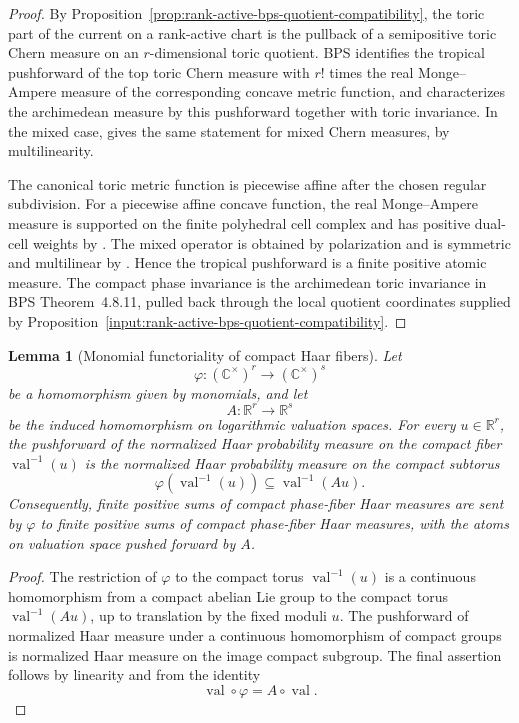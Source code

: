\documentclass[10pt,a4paper]{amsart}
\theoremstyle{plain}
\newtheorem{lemma}[theorem]{Lemma}
\theoremstyle{plain}
\numberwithin{equation}{section}
\begin{document}
\begin{proof}
	By Proposition~\ref{prop:rank-active-bps-quotient-compatibility}, the toric
	part of the current on a rank-active chart is the pullback of a semipositive
	toric Chern measure on an \(r\)-dimensional toric quotient.  BPS
	\cite[Theorem~4.8.11]{BPS14} identifies the tropical pushforward of the top
	toric Chern measure with \(r!\) times the real Monge--Ampere measure of the
	corresponding concave metric function, and characterizes the archimedean
	measure by this pushforward together with toric invariance.  In the mixed
	case, \cite[Corollary~4.8.12]{BPS14} gives the same statement for mixed Chern
	measures, by multilinearity.
	
	The canonical toric metric function is piecewise affine after the chosen
	regular subdivision.  For a piecewise affine concave function, the real
	Monge--Ampere measure is supported on the finite polyhedral cell complex and
	has positive dual-cell weights by \cite[Proposition~2.7.4]{BPS14}.  The mixed
	operator is obtained by polarization and is symmetric and multilinear by
	\cite[Definition~2.7.12 and Proposition~2.7.13]{BPS14}.  Hence the tropical
	pushforward is a finite positive atomic measure.  The compact phase
	invariance is the archimedean toric invariance in BPS Theorem~4.8.11, pulled
	back through the local quotient coordinates supplied by
	Proposition~\ref{input:rank-active-bps-quotient-compatibility}.
\end{proof}

\begin{lemma}[Monomial functoriality of compact Haar fibers]
	\label{lem:monomial-haar-fiber-functoriality}
	Let
	\[
	\varphi:(\mathbb C^\times)^r\longrightarrow(\mathbb C^\times)^s
	\]
	be a homomorphism given by monomials, and let
	\[
	A:\mathbb R^r\longrightarrow\mathbb R^s
	\]
	be the induced homomorphism on logarithmic valuation spaces.  For every
	\(u\in\mathbb R^r\), the pushforward of the normalized Haar probability
	measure on the compact fiber \(\operatorname{val}^{-1}(u)\) is the normalized
	Haar probability measure on the compact subtorus
	\[
	\varphi(\operatorname{val}^{-1}(u))
	\subseteq \operatorname{val}^{-1}(Au).
	\]
	Consequently, finite positive sums of compact phase-fiber Haar measures are
	sent by \(\varphi\) to finite positive sums of compact phase-fiber Haar
	measures, with the atoms on valuation space pushed forward by \(A\).
\end{lemma}

\begin{proof}
	The restriction of \(\varphi\) to the compact torus
	\(\operatorname{val}^{-1}(u)\) is a continuous homomorphism from a compact
	abelian Lie group to the compact torus \(\operatorname{val}^{-1}(Au)\), up to
	translation by the fixed moduli \(u\).  The pushforward of normalized Haar
	measure under a continuous homomorphism of compact groups is normalized Haar
	measure on the image compact subgroup.  The final assertion follows by
	linearity and from the identity
	\[
	\operatorname{val}\circ\varphi=A\circ\operatorname{val}.
	\]
\end{proof}
\end{document}
